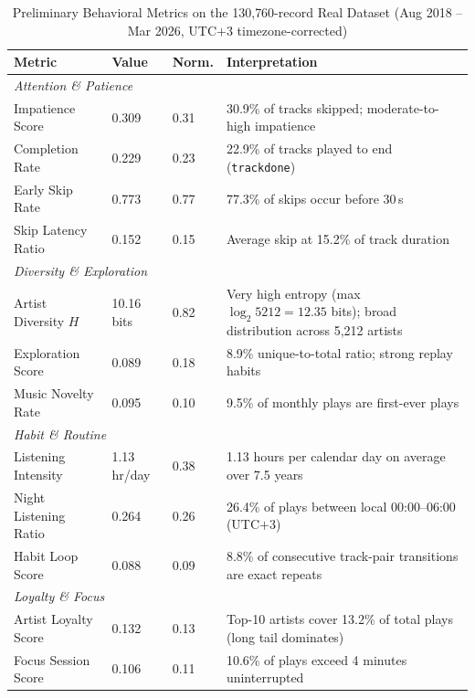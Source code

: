 \documentclass[conference]{IEEEtran}
\begin{document}
\begin{table}[ht]
\centering
\caption{Preliminary Behavioral Metrics on the 130{,}760-record Real Dataset (Aug 2018 -- Mar 2026, UTC$+$3 timezone-corrected)}
\label{tab:results}
\renewcommand{\arraystretch}{1.2}
\begin{tabular}{p{3.8cm} p{2.0cm} p{1.4cm} p{6.5cm}}
\toprule
\textbf{Metric} & \textbf{Value} & \textbf{Norm.} & \textbf{Interpretation} \\
\midrule
\multicolumn{4}{l}{\textit{Attention \& Patience}} \\
Impatience Score        & 0.309            & 0.31 & 30.9\% of tracks skipped; moderate-to-high impatience \\
Completion Rate         & 0.229            & 0.23 & 22.9\% of tracks played to end (\texttt{trackdone}) \\
Early Skip Rate         & 0.773            & 0.77 & 77.3\% of skips occur before 30\,s \\
Skip Latency Ratio      & 0.152            & 0.15 & Average skip at 15.2\% of track duration \\
\midrule
\multicolumn{4}{l}{\textit{Diversity \& Exploration}} \\
Artist Diversity $H$    & 10.16 bits       & 0.82 & Very high entropy (max $\log_2 5212{=}12.35$ bits); broad distribution across 5{,}212 artists \\
Exploration Score       & 0.089            & 0.18 & 8.9\% unique-to-total ratio; strong replay habits \\
Music Novelty Rate      & 0.095            & 0.10 & 9.5\% of monthly plays are first-ever plays \\
\midrule
\multicolumn{4}{l}{\textit{Habit \& Routine}} \\
Listening Intensity     & 1.13 hr/day      & 0.38 & 1.13 hours per calendar day on average over 7.5 years \\
Night Listening Ratio   & 0.264            & 0.26 & 26.4\% of plays between local 00:00--06:00 (UTC$+$3) \\
Habit Loop Score        & 0.088            & 0.09 & 8.8\% of consecutive track-pair transitions are exact repeats \\
\midrule
\multicolumn{4}{l}{\textit{Loyalty \& Focus}} \\
Artist Loyalty Score    & 0.132            & 0.13 & Top-10 artists cover 13.2\% of total plays (long tail dominates) \\
Focus Session Score     & 0.106            & 0.11 & 10.6\% of plays exceed 4 minutes uninterrupted \\

\end{tabular}
\end{table}
\end{document}
